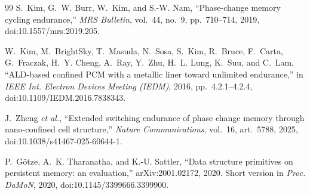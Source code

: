 \documentclass[11pt,a4paper]{article}
\begin{document}
\begin{thebibliography}{99}
S.~Kim, G.~W. Burr, W.~Kim, and S.-W. Nam,
``Phase-change memory cycling endurance,''
\emph{MRS Bulletin}, vol.~44, no.~9, pp.~710--714, 2019,
doi:10.1557/mrs.2019.205.

W.~Kim, M.~BrightSky, T.~Masuda, N.~Sosa, S.~Kim, R.~Bruce, F.~Carta,
G.~Fraczak, H.~Y. Cheng, A.~Ray, Y.~Zhu, H.~L. Lung, K.~Suu, and C.~Lam,
``ALD-based confined PCM with a metallic liner toward unlimited endurance,''
in \emph{IEEE Int. Electron Devices Meeting (IEDM)}, 2016, pp.~4.2.1--4.2.4,
doi:10.1109/IEDM.2016.7838343.

J.~Zheng \emph{et al.},
``Extended switching endurance of phase change memory through nano-confined
cell structure,''
\emph{Nature Communications}, vol.~16, art.~5788, 2025,
doi:10.1038/s41467-025-60644-1.

P.~G\"{o}tze, A.~K. Tharanatha, and K.-U. Sattler,
``Data structure primitives on persistent memory: an evaluation,''
arXiv:2001.02172, 2020. Short version in \emph{Proc. DaMoN}, 2020,
doi:10.1145/3399666.3399900.

\end{thebibliography}
\end{document}
